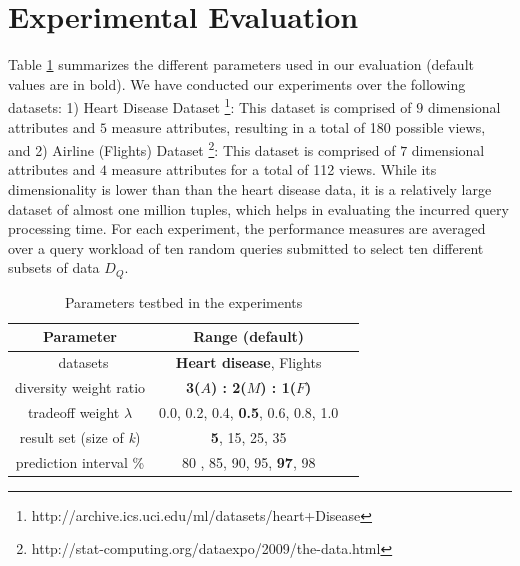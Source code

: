 
\section{Experimental Evaluation}\label{sec:experimental_testbed}

%
Table \ref{tab:tab-parameter} summarizes the different parameters used in our evaluation (default values are in bold).  
%
We have conducted our experiments over the following datasets: 1) Heart Disease Dataset \footnote{http://archive.ics.uci.edu/ml/datasets/heart+Disease}: This dataset is comprised of $9$ dimensional attributes and $5$ measure attributes, resulting in a total of 180 possible views, and 2) Airline (Flights) Dataset \footnote{http://stat-computing.org/dataexpo/2009/the-data.html}: This dataset is comprised of $7$ dimensional attributes and $4$ measure attributes for a total of 112 views. While its dimensionality is lower than than the heart disease data, it is a relatively large dataset of almost one million tuples, which helps in evaluating the incurred query processing time.
%
For each experiment, the performance measures are averaged over a query workload of ten random queries submitted to select ten different subsets of data $D_Q$. 
%


\begin{table}[t]
	\caption{Parameters testbed in the experiments}
	\vspace{-10pt}
	\label{tab:tab-parameter}
	\begin{tabular}{ccl}
		\toprule
		Parameter &Range (\textbf{default})\\
		\midrule\
		datasets & \textbf{Heart disease}, Flights\\
		diversity weight ratio & \textbf{3($ A $) : 2($ M $) : 1($ F $)} \\
		tradeoff weight $ \lambda $ & 0.0, 0.2, 0.4, \textbf{0.5}, 0.6, 0.8, 1.0 \\
		result set (size of \textit{k}) & \textbf{5}, 15, 25, 35\\
		prediction interval \% & 80 , 85, 90, 95, \textbf{97}, 98\\
		\bottomrule
	\end{tabular}
		\vspace{-2pt}
\end{table}



